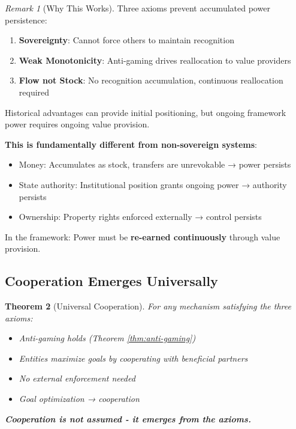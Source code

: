 \documentclass[11pt,a4paper]{article}
\newtheorem{theorem}{Theorem}[section]
\theoremstyle{definition}
\theoremstyle{remark}
\newtheorem{remark}[theorem]{Remark}
\begin{document}
\begin{remark}[Why This Works]
Three axioms prevent accumulated power persistence:

\begin{enumerate}
\item \textbf{Sovereignty}: Cannot force others to maintain recognition
\item \textbf{Weak Monotonicity}: Anti-gaming drives reallocation to value providers
\item \textbf{Flow not Stock}: No recognition accumulation, continuous reallocation required
\end{enumerate}

Historical advantages can provide initial positioning, but ongoing framework power requires ongoing value provision.

\textbf{This is fundamentally different from non-sovereign systems}:
\begin{itemize}
\item Money: Accumulates as stock, transfers are unrevokable → power persists
\item State authority: Institutional position grants ongoing power → authority persists
\item Ownership: Property rights enforced externally → control persists
\end{itemize}

In the framework: Power must be \textbf{re-earned continuously} through value provision.
\end{remark}

\subsection{Cooperation Emerges Universally}

\begin{theorem}[Universal Cooperation]
For \textit{any} mechanism satisfying the three axioms:
\begin{itemize}
\item Anti-gaming holds (Theorem \ref{thm:anti-gaming})
\item Entities maximize goals by cooperating with beneficial partners
\item No external enforcement needed
\item Goal optimization → cooperation
\end{itemize}

\textbf{Cooperation is not assumed - it emerges from the axioms.}
\end{theorem}
\end{document}
